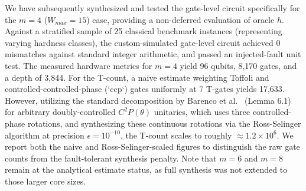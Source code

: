 \documentclass[conference]{IEEEtran} \IEEEoverridecommandlockouts
\begin{document}
\begin{table}[ht]
\centering
\caption{Resource estimates for the LP-bound bounding oracle ($h$) at varying core sizes ($m$). The $(m, W_{max})$ pairings shown (15/31/63) are representative illustrative example values chosen for the demonstration, not a derived or assumed functional relationship between core size and maximum item weight --- these are independent parameters in general knapsack instances. Qubit counts are derived from the register layout mapping to the Draper, Vedral-Barenco-Ekert, and Thapliyal reversible arithmetic blocks. The fractional fixed-point precision ($k$) scales with $W_{max}$ per Lemma \ref{lem:precision}. Depth, gate, and T-counts are not yet available as full gate-level decomposition has been deferred for this predicate.}


We have subsequently synthesized and tested the gate-level circuit specifically for the $m=4$ ($W_{max}=15$) case, providing a non-deferred evaluation of oracle $h$. Against a stratified sample of 25 classical benchmark instances (representing varying hardness classes), the custom-simulated gate-level circuit achieved 0 mismatches against standard integer arithmetic, and passed an injected-fault unit test. The measured hardware metrics for $m=4$ yield 96 qubits, 8,170 gates, and a depth of 3,844. For the T-count, a naive estimate weighting Toffoli and controlled-controlled-phase (`ccp`) gates uniformly at 7 T-gates yields 17,633. However, utilizing the standard decomposition by Barenco et al.~\cite{barenco1995} (Lemma 6.1) for arbitrary doubly-controlled $C^2P(\theta)$ unitaries, which uses three controlled-phase rotations, and synthesizing these continuous rotations via the Ross-Selinger algorithm at precision $\epsilon=10^{-10}$, the T-count scales to roughly $\approx 1.2 \times 10^6$. We report both the naive and Ross-Selinger-scaled figures to distinguish the raw gate counts from the fault-tolerant synthesis penalty. Note that $m=6$ and $m=8$ remain at the analytical estimate status, as full synthesis was not extended to those larger core sizes.


\end{table}
\end{document}
